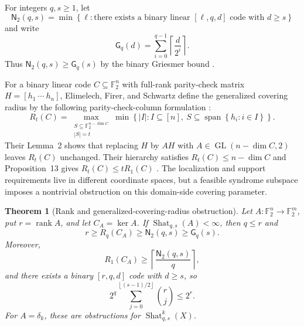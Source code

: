\documentclass[11pt,letterpaper]{article}
\theoremstyle{plain}
\newtheorem{theorem}{Theorem}[section]
\theoremstyle{definition}
\newcommand{\F}{\mathbb{F}_2}
\newcommand{\rank}{\operatorname{rank}}
\newcommand{\Shat}{\operatorname{Shat}}
\newcommand{\1}{\mathbf{1}}
\newcommand{\abs}[1]{\left|#1\right|}
\newcommand{\set}[1]{\left\{#1\right\}}
\newcommand{\ceil}[1]{\left\lceil#1\right\rceil}
\newcommand{\floor}[1]{\left\lfloor#1\right\rfloor}
\begin{document}
For integers $q,s\ge1$, let
\begin{equation}\label{eq:shortest-code-length}
 \mathsf N_2(q,s)=
 \min\set{\ell:\text{there exists a binary linear $[\ell,q,d]$ code with $d\ge s$}}
\end{equation}
and write
\begin{equation}\label{eq:griesmer-function}
 \mathsf G_q(d)=\sum_{i=0}^{q-1}\ceil{\frac{d}{2^i}}.
\end{equation}
Thus $\mathsf N_2(q,s)\ge\mathsf G_q(s)$ by the binary Griesmer bound \cite{griesmer1960}.

For a binary linear code $C\subseteq\F^n$ with full-rank parity-check matrix
$H=[h_1\ \cdots\ h_n]$, Elimelech, Firer, and Schwartz define the generalized
covering radius by the following parity-check-column formulation
\cite[Definition~1]{elimelech2021}:
\begin{equation}\label{eq:generalized-covering-radius}
 R_t(C)=
 \max_{\substack{S\subseteq\F^{n-\dim C}\\|S|=t}}
 \min\set{\abs I:I\subseteq[n],\ S\subseteq
 \operatorname{span}\set{h_i:i\in I}}.
\end{equation}
Their Lemma~2 shows that replacing $H$ by $AH$ with
$A\in\operatorname{GL}(n-\dim C,2)$ leaves $R_t(C)$ unchanged.  Their hierarchy
satisfies $R_t(C)\le n-\dim C$ and Proposition~13 gives
$R_t(C)\le tR_1(C)$ \cite[Lemma~2, Eq.~(2), and Proposition~13]{elimelech2021}.
The localization and support requirements live in different coordinate spaces, but a
feasible syndrome subspace imposes a nontrivial obstruction on this domain-side
covering parameter.

\begin{theorem}[Rank and generalized-covering-radius obstruction]
\label{thm:domain-code}
Let $A:\F^n\to\F^m$, put $r=\rank A$, and let $C_A=\ker A$.  If
$\Shat_{q,s}(A)<\infty$, then $q\le r$ and
\begin{equation}\label{eq:domain-covering}
 r\ge R_q(C_A)\ge \mathsf N_2(q,s)\ge \mathsf G_q(s).
\end{equation}
Moreover,
\begin{equation}\label{eq:ordinary-covering-obstruction}
 R_1(C_A)\ge\ceil{\frac{\mathsf N_2(q,s)}{q}},
\end{equation}
and there exists a binary $[r,q,d]$ code with $d\ge s$, so
\begin{equation}\label{eq:domain-hamming}
 2^q\sum_{j=0}^{\floor{(s-1)/2}}\binom rj\le2^r.
\end{equation}
For $A=\delta_k$, these are obstructions for $\Shat_{q,s}^k(X)$.
\end{theorem}
\end{document}
